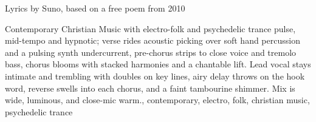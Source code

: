 
\begin{notes}
Lyrics by Suno, based on a free poem from 2010
\end{notes}
\begin{style}
Contemporary Christian Music with electro-folk and psychedelic trance pulse, mid-tempo and hypnotic; verse rides acoustic picking over soft hand percussion and a pulsing synth undercurrent, pre-chorus strips to close voice and tremolo bass, chorus blooms with stacked harmonies and a chantable lift. Lead vocal stays intimate and trembling with doubles on key lines, airy delay throws on the hook word, reverse swells into each chorus, and a faint tambourine shimmer. Mix is wide, luminous, and close-mic warm., contemporary, electro, folk, christian music, psychedelic trance
\end{style}
